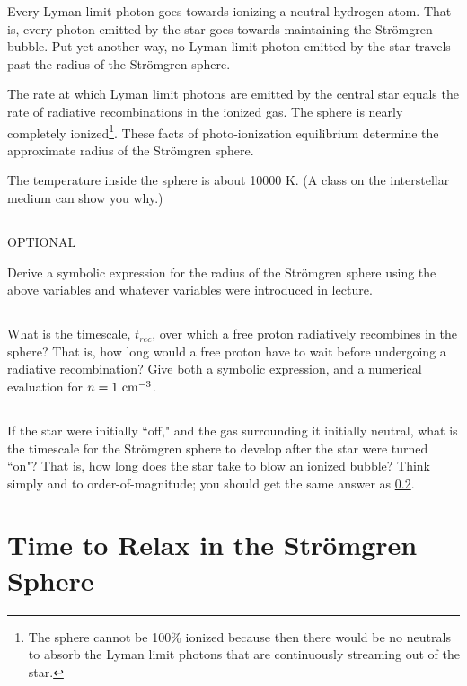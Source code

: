 \documentclass[11pt]{article}
\def\trec{{t_{rec}}}
\begin{document}
Every Lyman limit photon goes towards ionizing a neutral hydrogen atom. That
is, every photon emitted by the star goes towards maintaining the Str\"omgren
bubble. Put yet another way, no Lyman limit photon emitted by the star travels
past the radius of the Str\"omgren sphere.

The rate at which Lyman limit photons are emitted by the central star equals
the rate of radiative recombinations in the ionized gas. The sphere is nearly
completely ionized\footnote{The 
sphere cannot be 100\% ionized because then there would be no neutrals to
absorb the Lyman limit photons that are continuously streaming out of the star.}.
These facts of photo-ionization equilibrium determine the
approximate radius of the Str\"omgren sphere.

The temperature inside the sphere is about 10000 K. (A class on the interstellar medium can show you why.)

\subsection{} OPTIONAL

Derive a symbolic expression for the radius of the Str\"omgren sphere using the
above variables and whatever variables were introduced in lecture.

\subsection{}\label{p2partb}

What is the timescale, $\trec$, over which a free proton radiatively recombines in
the sphere? That is, how long would a free proton have to wait before
undergoing a radiative recombination? Give both a symbolic expression, and a
numerical evaluation for $n = 1~{\rm cm}^{-3}$.

\subsection{}

If the star were initially ``off," and the gas surrounding it initially neutral,
what is the timescale for the Str\"omgren sphere to develop after the star were
turned ``on"? That is, how long does the star take to blow an ionized bubble?
Think simply and to order-of-magnitude; you should get the same answer as \ref{p2partb}.

\section{Time to Relax in the Str\"omgren Sphere}
\end{document}
